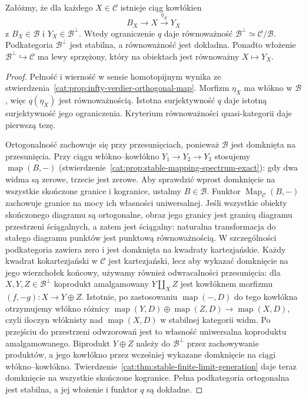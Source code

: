 \begin{twierdzenie}\label{cat:thm:infty-verdier-orthogonal-quotient}
Załóżmy, że dla każdego $X\in\mathcal C$ istnieje ciąg kowłókien
\[
 B_X\longrightarrow X\xrightarrow{\eta_X}Y_X
\]
z $B_X\in\mathcal B$ i $Y_X\in\mathcal B^\perp$. Wtedy ograniczenie $q$ daje równoważność $\mathcal B^\perp\simeq\mathcal C/\mathcal B$. Podkategoria $\mathcal B^\perp$ jest stabilna, a równoważność jest dokładna. Ponadto włożenie $\mathcal B^\perp\hookrightarrow\mathcal C$ ma lewy sprzężony, który na obiektach jest równoważny $X\mapsto Y_X$.
\end{twierdzenie}
\begin{proof}
Pełność i wierność w sensie homotopijnym wynika ze stwierdzenia~\ref{cat:prop:infty-verdier-orthogonal-map}. Morfizm $\eta_X$ ma włókno w $\mathcal B$, więc $q(\eta_X)$ jest równoważnością. Istotna surjektywność $q$ daje istotną surjektywność jego ograniczenia. Kryterium równoważności quasi-kategorii daje pierwszą tezę.

Ortogonalność zachowuje się przy przesunięciach, ponieważ $\mathcal B$ jest domknięta na przesunięcia. Przy ciągu włókno--kowłókno $Y_1\to Y_2\to Y_3$ stosujemy $\operatorname{map}(B,-)$ (stwierdzenie~\ref{cat:prop:stable-mapping-spectrum-exact}): gdy dwa widma są zerowe, trzecie jest zerowe. Aby sprawdzić wprost domknięcie na wszystkie skończone granice i kogranice, ustalmy $B\in\mathcal B$. Funktor $\operatorname{Map}_{\mathcal C}(B,-)$ zachowuje granice na mocy ich własności uniwersalnej. Jeśli wszystkie obiekty skończonego diagramu są ortogonalne, obraz jego granicy jest granicą diagramu przestrzeni ściągalnych, a zatem jest ściągalny: naturalna transformacja do stałego diagramu punktów jest punktową równoważnością. W szczególności podkategoria zawiera zero i jest domknięta na kwadraty kartezjańskie. Każdy kwadrat kokartezjański w $\mathcal C$ jest kartezjański, lecz aby wykazać domknięcie na jego wierzchołek końcowy, używamy również odwracalności przesunięcia: dla $X,Y,Z\in\mathcal B^\perp$ koprodukt amalgamowany $Y\amalg_X Z$ jest kowłóknem morfizmu $(f,-g):X\to Y\oplus Z$. Istotnie, po zastosowaniu $\operatorname{map}(-,D)$ do tego kowłókna otrzymujemy włókno różnicy $\operatorname{map}(Y,D)\oplus\operatorname{map}(Z,D)\to\operatorname{map}(X,D)$, czyli iloczyn włóknisty nad $\operatorname{map}(X,D)$ w stabilnej kategorii widm. Po przejściu do przestrzeni odwzorowań jest to własność uniwersalna koproduktu amalgamowanego. Biprodukt $Y\oplus Z$ należy do $\mathcal B^\perp$ przez zachowywanie produktów, a jego kowłókno przez wcześniej wykazane domknięcie na ciągi włókno--kowłókno. Twierdzenie~\ref{cat:thm:stable-finite-limit-generation} daje teraz domknięcie na wszystkie skończone kogranice. Pełna podkategoria ortogonalna jest stabilna, a jej włożenie i funktor $q$ są dokładne.


\end{proof}
